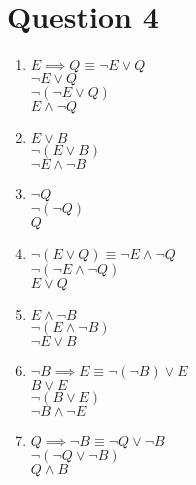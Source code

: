 \documentclass{article}
\begin{document}
    \section*{Question 4}
    \begin{enumerate}
    \item 
    $E \implies Q  \equiv \neg E \lor Q$\\
    $\neg E \lor Q$ \\
    $\neg (\neg E \lor Q)$ \\
    $E \land \neg Q$ \\
    \item 
    $E \lor B$ \\
    $\neg (E \lor B)$ \\
    $\neg E \land \neg B$ \\
    \item 
    $\neg Q$ \\
    $\neg (\neg Q)$ \\
    $Q$ \\
    \item 
    $\neg (E \lor Q) \equiv \neg E \land \neg Q$ \\
    $\neg(\neg E \land \neg Q)$ \\
    $E \lor Q$ \\
    \item 
    $E \land \neg B$ \\
    $\neg (E \land \neg B)$ \\
    $\neg E \lor B$ \\
    \item 
    $\neg B \implies E \equiv \neg (\neg B) \lor E$ \\
    $B \lor E$ \\
    $\neg(B \lor E)$ \\
    $\neg B \land \neg E$
    \item 
    $Q \implies \neg B \equiv \neg Q \lor \neg B$ \\
    $\neg (\neg Q \lor \neg B)$ \\
    $Q \land B$ \\
    \end{enumerate}
     \newpage
\end{document}
